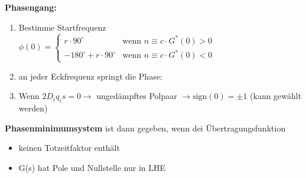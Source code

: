 \begin{tcolorbox}[colback=white!10!white,colframe=blue!50!white,title=Konstruktionsregeln]
    \tcblower
    \textbf{Phasengang:}
    \begin{enumerate}
        \item Bestimme Startfrequenz\\
        $\phi(0) = \begin{cases}
    r\cdot 90^\circ &\mbox{wenn } n \equiv c\cdot G^*(0)>0\\
    -180^\circ+r\cdot 90^\circ & \mbox{wenn } n \equiv c\cdot G^*(0)<0
        \end{cases} $
        \item an jeder Eckfrequenz springt die Phase:
        \item Wenn $2D_iq_is = 0 \rightarrow$ ungedämpftes Polpaar $\rightarrow\mbox{sign}(0) = \pm 1$ (kann gewählt werden)
    \end{enumerate}
        
\end{tcolorbox}
\columnbreak
\begin{tcolorbox}[colback=white!10!white,colframe=green!30!black,title=Phasenminimumsystem]
\textbf{Phasenminimumsystem} ist dann gegeben, wenn dei Übertragungsfunktion
\begin{itemize}
    \item keinen Totzeitfaktor enthält
    \item G(s) hat Pole und Nullstelle nur in LHE
\end{itemize}
\end{tcolorbox}
